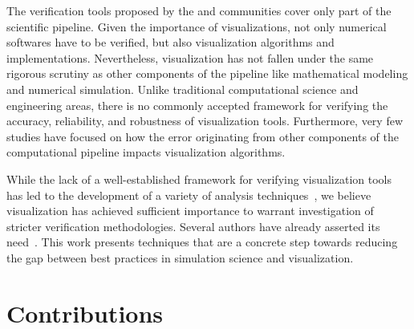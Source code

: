 The verification tools proposed by the \cs{} and \cse{} communities cover
only part of the scientific pipeline. Given the importance of visualizations, 
not only numerical softwares have to be verified, 
but also visualization algorithms and implementations.
%
Nevertheless, visualization has not fallen under the same
rigorous scrutiny as other components of the pipeline
like mathematical modeling and numerical simulation.
Unlike traditional computational science and engineering areas,
there is no commonly accepted framework for verifying the accuracy, reliability, 
and robustness of visualization tools. 
Furthermore, very few studies have focused on how the error originating from 
other components of the computational pipeline
impacts visualization algorithms. 

While the lack of a well-established framework for verifying visualization
tools has led to the development of a variety of analysis techniques~\cite{zhou01,Tory:2004:HFV:951847.951892}, we believe visualization 
has achieved sufficient importance to warrant investigation of
stricter verification methodologies. Several authors have
already asserted its need~\cite{Globus:1994:FWS:182452.182465, globus95,kirby-vv-08}. This work presents techniques that are a concrete step towards reducing the gap between best practices in simulation science and visualization.

\section{Contributions}

